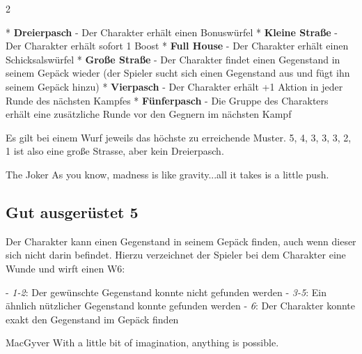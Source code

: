 \begin{multicols}{2}
\begin{tcolorbox}
* \textbf{Dreierpasch} - Der Charakter erhält einen Bonuswürfel
* \textbf{Kleine Straße} - Der Charakter erhält sofort 1 Boost
* \textbf{Full House} - Der Charakter erhält einen Schicksalswürfel
* \textbf{Große Straße} - Der Charakter findet einen Gegenstand in seinem Gepäck wieder (der Spieler sucht sich einen Gegenstand aus und fügt ihn seinem Gepäck hinzu)
* \textbf{Vierpasch} - Der Charakter erhält +1 Aktion in jeder Runde des nächsten Kampfes
* \textbf{Fünferpasch} - Die Gruppe des Charakters erhält eine zusätzliche Runde vor den Gegnern im nächsten Kampf

Es gilt bei einem Wurf jeweils das höchste zu erreichende Muster. 5, 4, 3, 3, 3, 2, 1 ist also eine große Strasse, aber kein Dreierpasch.

\begin{pquote}{The Joker}
As you know, madness is like gravity...all it takes is a little push.
\end{pquote}

\vspace{3mm}



\end{tcolorbox}

\begin{tcolorbox}
    \subsection*{Gut ausgerüstet \hfill \small{5 }}
    \tcblower
Der Charakter kann einen Gegenstand in seinem Gepäck finden, auch wenn dieser sich nicht darin befindet. Hierzu verzeichnet der Spieler bei dem Charakter eine Wunde und wirft einen W6:

-  \textit{1-2}: Der gewünschte Gegenstand konnte nicht gefunden werden
-  \textit{3-5}: Ein ähnlich nützlicher Gegenstand konnte gefunden werden
- \textit{6}: Der Charakter konnte exakt den Gegenstand im Gepäck finden

\begin{pquote}{MacGyver}
With a little bit of imagination, anything is possible.
\end{pquote}

\vspace{3mm}




\end{tcolorbox}
\end{multicols}
